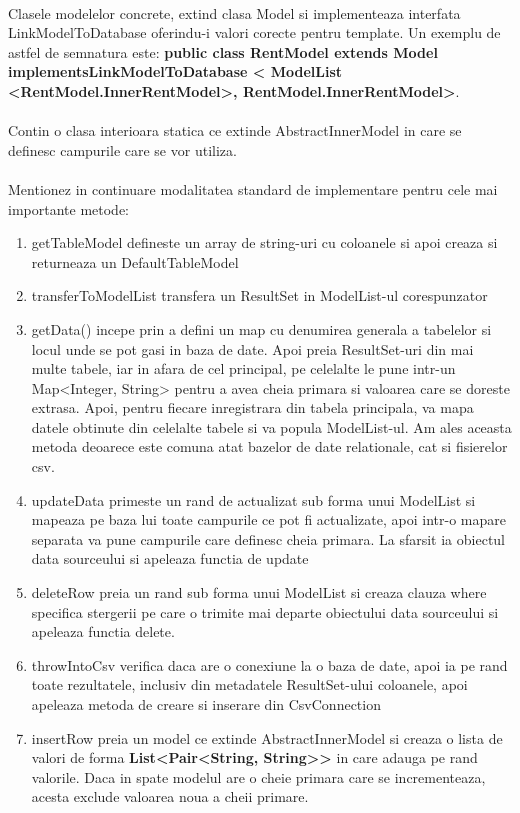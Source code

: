 \documentclass[oneside]{article}
\begin{document}
\paragraph{} Clasele modelelor concrete, extind clasa Model si implementeaza interfata LinkModelToDatabase oferindu-i valori corecte pentru template. Un exemplu de astfel de semnatura este: \textbf{public class RentModel extends Model implementsLinkModelToDatabase < ModelList <RentModel.InnerRentModel>, RentModel.InnerRentModel>}.

\paragraph{} Contin o clasa interioara statica ce extinde AbstractInnerModel in care se definesc campurile care se vor utiliza.
\paragraph{} Mentionez in continuare modalitatea standard de implementare pentru cele mai importante metode:
\begin{enumerate}
    \item getTableModel defineste un array de string-uri cu coloanele si apoi creaza si returneaza un DefaultTableModel
    \item transferToModelList transfera un ResultSet in ModelList-ul corespunzator
    \item getData() incepe prin a defini un map cu denumirea generala a tabelelor si locul unde se pot gasi in baza de date. Apoi preia ResultSet-uri din mai multe tabele, iar in afara de cel principal, pe celelalte le pune intr-un Map<Integer, String> pentru a avea cheia primara si valoarea care se doreste extrasa. Apoi, pentru fiecare inregistrara din tabela principala, va mapa datele obtinute din celelalte tabele si va popula ModelList-ul. Am ales aceasta metoda deoarece este comuna atat bazelor de date relationale, cat si fisierelor csv.
    \item updateData primeste un rand de actualizat sub forma unui ModelList si mapeaza pe baza lui toate campurile ce pot fi actualizate, apoi intr-o mapare separata va pune campurile care definesc cheia primara. La sfarsit ia obiectul data sourceului si apeleaza functia de update
    \item deleteRow preia un rand sub forma unui ModelList si creaza clauza where specifica stergerii pe care o trimite mai departe obiectului data sourceului si apeleaza functia delete.
    \item throwIntoCsv verifica daca are o conexiune la o baza de date, apoi ia pe rand toate rezultatele, inclusiv din metadatele ResultSet-ului coloanele, apoi apeleaza metoda de creare si inserare din CsvConnection
    \item insertRow preia un model ce extinde AbstractInnerModel si creaza o lista de valori de forma \textbf{List<Pair<String, String>{}>} in care adauga pe rand valorile. Daca in spate modelul are o cheie primara care se incrementeaza, acesta exclude valoarea noua a cheii primare.
\end{enumerate}
\end{document}
